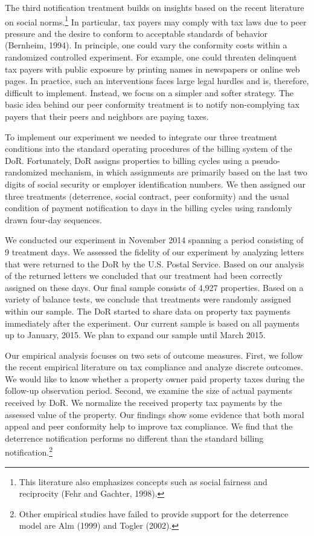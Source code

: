\documentclass[12pt,titlepage]{article}
\begin{document}
The third notification treatment builds on insights based on the
recent literature on social norms.\footnote{This literature also
  emphasizes concepts such as social fairness and reciprocity (Fehr
  and Gachter, 1998).} In particular, tax payers may comply with tax
laws due to peer pressure and the desire to conform to acceptable
standards of behavior (Bernheim, 1994). In principle, one could vary
the conformity costs within a randomized controlled experiment. For
example, one could threaten delinquent tax payers with public exposure
by printing names in newspapers or online web pages. In practice, such
an interventions faces large legal hurdles and is, therefore,
difficult to implement. Instead, we focus on a simpler and softer
strategy.  The basic idea behind our peer conformity treatment is to
notify non-complying tax payers that their peers and neighbors are
paying taxes.

To implement our experiment we needed to integrate our three treatment
conditions into the standard operating procedures of the billing
system of the DoR. Fortunately, DoR assigns properties to billing
cycles using a pseudo-randomized mechanism, in which assignments are
primarily based on the last two digits of social security or employer
identification numbers.  We then assigned our three treatments
(deterrence, social contract, peer conformity) and the usual condition
of payment notification to days in the billing cycles using randomly
drawn four-day sequences.

We conducted our experiment in November 2014 spanning a period
consisting of 9 treatment days.  We assessed the fidelity of our
experiment by analyzing letters that were returned to the DoR by the
U.S. Postal Service. Based on our analysis of the returned letters we
concluded that our treatment had been correctly assigned on these
days. Our final sample consists of 4,927 properties. Based on a
variety of balance tests, we conclude that treatments were randomly
assigned within our sample. The DoR started to share data on property
tax payments immediately after the experiment. Our current sample is
based on all payments up to January, 2015. We plan to expand our
sample until March 2015.

Our empirical analysis focuses on two sets of outcome measures. First,
we follow the recent empirical literature on tax compliance and
analyze discrete outcomes. We would like to know whether a property
owner paid property taxes during the follow-up observation period.
Second, we examine the size of actual payments received by DoR.  We
normalize the received property tax payments by the assessed value of
the property.  Our findings show some evidence that both
moral appeal and peer conformity help to improve tax compliance. We
find that the deterrence notification performs no different than the
standard billing notification.\footnote{Other empirical studies have
  failed to provide support for the deterrence model are Alm (1999)
  and Togler (2002).}
\end{document}
